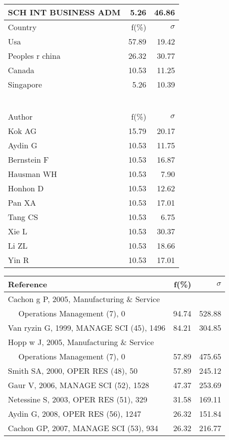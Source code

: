 \documentclass[a4paper,11pt]{report}
\begin{document}
\begin{landscape}
\begin{table}[!ht]
{\begin{tabular}{|l r r|}
SCH INT BUSINESS ADM & 5.26 & 46.86\\
\hline
\hline
Country & f(\%) & $\sigma$\\
\hline
Usa & 57.89 & 19.42\\
Peoples r china & 26.32 & 30.77\\
Canada & 10.53 & 11.25\\
Singapore & 5.26 & 10.39\\
 &  & \\
 &  & \\
 &  & \\
 &  & \\
 &  & \\
 &  & \\
\hline
\hline
Author & f(\%) & $\sigma$\\
\hline
Kok AG & 15.79 & 20.17\\
Aydin G & 10.53 & 11.75\\
Bernstein F & 10.53 & 16.87\\
Hausman WH & 10.53 & 7.90\\
Honhon D & 10.53 & 12.62\\
Pan XA & 10.53 & 17.01\\
Tang CS & 10.53 & 6.75\\
Xie L & 10.53 & 30.37\\
Li ZL & 10.53 & 18.66\\
Yin R & 10.53 & 17.01\\
\hline
\end{tabular}
}
{\scriptsize\begin{tabular}{|l r r|}
\hline
Reference & f(\%) & $\sigma$\\
\hline
Cachon g P, 2005, Manufacturing \& Service &  & \\
$\quad$ Operations Management (7), 0 & 94.74 & 528.88\\
Van ryzin G, 1999, MANAGE SCI (45), 1496 & 84.21 & 304.85\\
Hopp w J, 2005, Manufacturing \& Service &  & \\
$\quad$ Operations Management (7), 0 & 57.89 & 475.65\\
Smith SA, 2000, OPER RES (48), 50 & 57.89 & 245.12\\
Gaur V, 2006, MANAGE SCI (52), 1528 & 47.37 & 253.69\\
Netessine S, 2003, OPER RES (51), 329 & 31.58 & 169.11\\
Aydin G, 2008, OPER RES (56), 1247 & 26.32 & 151.84\\
Cachon GP, 2007, MANAGE SCI (53), 934 & 26.32 & 216.77\\

\end{tabular}}
\end{table}
\end{landscape}
\end{document}
